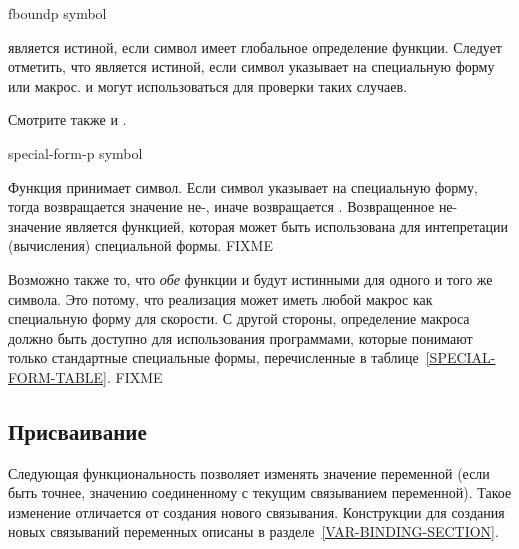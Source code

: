 \begin{defun}[Function]
fboundp symbol

 является истиной, если символ имеет глобальное определение
функции.
Следует отметить, что  является истиной, если символ указывает на
специальную форму или макрос.  и  могут
использоваться для проверки таких случаев.

Смотрите также  и .
\end{defun}

\begin{defun}[Function]
special-form-p symbol

Функция  принимает символ. Если символ указывает на
специальную форму, тогда возвращается значение не-{\false}, иначе возвращается {\false}.
Возвращенное не-{\nil} значение является функцией,
которая может быть использована для интепретации (вычисления) специальной
формы. FIXME

Возможно также то, что \emph{обе} функции  и
 будут истинными для одного и того же символа. Это потому,
что реализация может иметь любой макрос как специальную форму для скорости.
С другой стороны, определение макроса должно быть доступно для использования
программами, которые понимают только стандартные специальные формы,
перечисленные в таблице~\ref{SPECIAL-FORM-TABLE}. FIXME
\end{defun}

\subsection{Присваивание}

Следующая функциональность позволяет изменять значение переменной (если быть
точнее, значению соединенному с текущим связыванием переменной).
Такое изменение отличается от создания нового связывания.
Конструкции для создания новых связываний переменных описаны в
разделе~\ref{VAR-BINDING-SECTION}.

